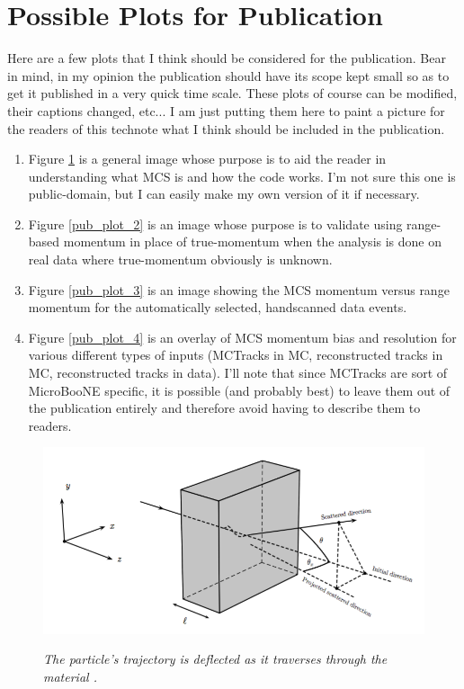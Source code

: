 \section{Possible Plots for Publication}\label{publicplots_section}
Here are a few plots that I think should be considered for the publication. Bear in mind, in my opinion the publication should have its scope kept small so as to get it published in a very quick time scale. These plots of course can be modified, their captions changed, etc... I am just putting them here to paint a picture for the readers of this technote what I think should be included in the publication.
\begin{enumerate}
	\item Figure \ref{pub_plot_1} is a general image whose purpose is to aid the reader in understanding what MCS is and how the code works. I'm not sure this one is public-domain, but I can easily make my own version of it if necessary.
	\item Figure \ref{pub_plot_2} is an image whose purpose is to validate using range-based momentum in place of true-momentum when the analysis is done on real data where true-momentum obviously is unknown.
	\item Figure \ref{pub_plot_3} is an image showing the MCS momentum versus range momentum for the automatically selected, handscanned data events.
	\item Figure \ref{pub_plot_4} is an overlay of MCS momentum bias and resolution for various different types of inputs ({\sc MCTracks} in MC, reconstructed tracks in MC, reconstructed tracks in data). I'll note that since {\sc MCTracks} are sort of MicroBooNE specific, it is possible (and probably best) to leave them out of the publication entirely and therefore avoid having to describe them to readers.
\end{enumerate}

\begin{figure}[ht!]
\centering
	\includegraphics[width=0.5\linewidth]{Figures/mcs_nocap.png} \\
\caption{\textit{The particle's trajectory is deflected as it traverses through the material \cite{leonidas1}.}}\label{pub_plot_1}
\end{figure}

